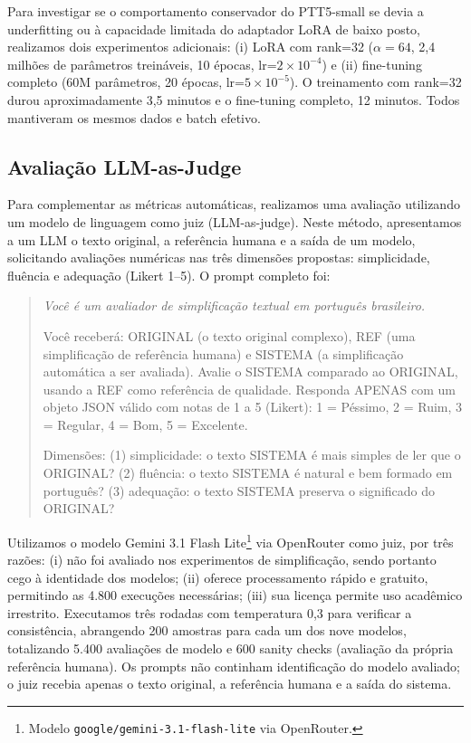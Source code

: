 \documentclass[a4paper, twocolumn, 11pt, twoside]{article}
\begin{document}
Para investigar se o comportamento conservador do PTT5-small se devia a
underfitting ou à capacidade limitada do adaptador LoRA de baixo posto,
realizamos dois experimentos adicionais: (i) LoRA com rank=32
($\alpha=64$, 2,4 milhões de parâmetros treináveis, 10 épocas, lr=$2\times10^{-4}$)
e (ii) fine-tuning completo (60M parâmetros, 20 épocas,
lr=$5\times10^{-5}$). O treinamento com rank=32 durou aproximadamente
3,5 minutos e o fine-tuning completo, 12 minutos. Todos mantiveram os
mesmos dados e batch efetivo.

\subsection{Avaliação LLM-as-Judge}

Para complementar as métricas automáticas, realizamos uma avaliação
utilizando um modelo de linguagem como juiz (LLM-as-judge).
Neste método, apresentamos a um LLM o texto original, a
referência humana e a saída de um modelo, solicitando avaliações
numéricas nas três dimensões propostas: simplicidade,
fluência e adequação (Likert 1--5). O prompt completo foi:

\begin{quote}\small\em
Você é um avaliador de simplificação textual em português brasileiro.

Você receberá: ORIGINAL (o texto original complexo), REF (uma simplificação de referência humana) e SISTEMA (a simplificação automática a ser avaliada). Avalie o SISTEMA comparado ao ORIGINAL, usando a REF como referência de qualidade. Responda APENAS com um objeto JSON válido com notas de 1 a 5 (Likert): 1 = Péssimo, 2 = Ruim, 3 = Regular, 4 = Bom, 5 = Excelente.

Dimensões: (1) simplicidade: o texto SISTEMA é mais simples de ler que o ORIGINAL? (2) fluência: o texto SISTEMA é natural e bem formado em português? (3) adequação: o texto SISTEMA preserva o significado do ORIGINAL?
\end{quote}

Utilizamos o modelo Gemini 3.1 Flash Lite\footnote{Modelo \texttt{google/gemini-3.1-flash-lite} via OpenRouter.} via OpenRouter como juiz, por
três razões: (i) não foi avaliado nos experimentos de simplificação,
sendo portanto cego à identidade dos modelos; (ii) oferece
processamento rápido e gratuito, permitindo as 4.800 execuções
necessárias; (iii) sua licença permite uso acadêmico irrestrito.
Executamos três rodadas com temperatura 0,3 para verificar a
consistência, abrangendo 200 amostras para cada um dos nove
modelos, totalizando 5.400 avaliações de modelo e 600 sanity checks
(avaliação da própria referência humana). Os prompts não continham
identificação do modelo avaliado; o juiz recebia apenas o texto
original, a referência humana e a saída do sistema.
\end{document}
